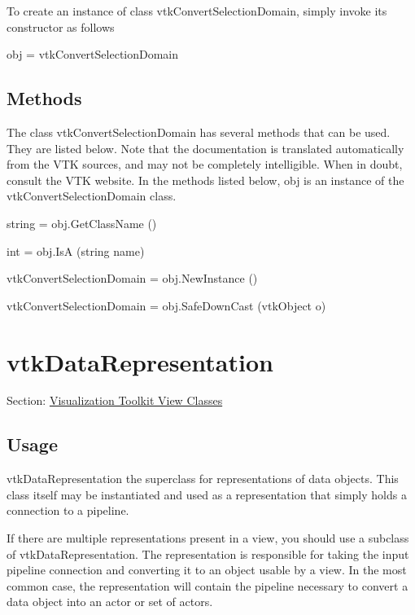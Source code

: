 To create an instance of class vtk\-Convert\-Selection\-Domain, simply invoke its constructor as follows \begin{DoxyVerb}  obj = vtkConvertSelectionDomain
\end{DoxyVerb}
 \hypertarget{vtkwidgets_vtkxyplotwidget_Methods}{}\subsection{Methods}\label{vtkwidgets_vtkxyplotwidget_Methods}
The class vtk\-Convert\-Selection\-Domain has several methods that can be used. They are listed below. Note that the documentation is translated automatically from the V\-T\-K sources, and may not be completely intelligible. When in doubt, consult the V\-T\-K website. In the methods listed below, {\ttfamily obj} is an instance of the vtk\-Convert\-Selection\-Domain class. 
\begin{DoxyItemize}
\item {\ttfamily string = obj.\-Get\-Class\-Name ()}  
\item {\ttfamily int = obj.\-Is\-A (string name)}  
\item {\ttfamily vtk\-Convert\-Selection\-Domain = obj.\-New\-Instance ()}  
\item {\ttfamily vtk\-Convert\-Selection\-Domain = obj.\-Safe\-Down\-Cast (vtk\-Object o)}  
\end{DoxyItemize}\hypertarget{vtkviews_vtkdatarepresentation}{}\section{vtk\-Data\-Representation}\label{vtkviews_vtkdatarepresentation}
Section\-: \hyperlink{sec_vtkviews}{Visualization Toolkit View Classes} \hypertarget{vtkwidgets_vtkxyplotwidget_Usage}{}\subsection{Usage}\label{vtkwidgets_vtkxyplotwidget_Usage}
vtk\-Data\-Representation the superclass for representations of data objects. This class itself may be instantiated and used as a representation that simply holds a connection to a pipeline.

If there are multiple representations present in a view, you should use a subclass of vtk\-Data\-Representation. The representation is responsible for taking the input pipeline connection and converting it to an object usable by a view. In the most common case, the representation will contain the pipeline necessary to convert a data object into an actor or set of actors.

